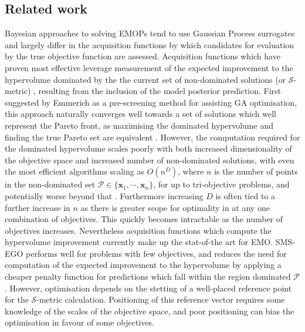 \documentclass[runningheads]{llncs}
\newcommand{\bx}{\mathbf{x}}
\begin{document}
\subsection{Related work}\label{section:related_work}
Bayesian approaches to solving EMOPs tend to use Gaussian Process surrogates and largely differ in the acquisition functions by which candidates for evaluation by the true objective function are assessed.  Acquisition functions which have proven most effective leverage measurement of the expected improvement to the hypervolume dominated by the the current set of non-dominated solutions (or $\mathcal{S}$-metric) \cite{emmerich2008computation}, resulting from the inclusion of the model posterior prediction. First suggested by Emmerich \cite{emmerich2006single} as a pre-screening method for assisting GA optimisation, this approach naturally converges well towards a set of solutions which well represent the Pareto front, as maximising the dominated hypervolume and finding the true Pareto set are equivalent \cite{fleischer2003measure}. However, the computation required for the dominated hypervolume scales poorly with both increased dimensionality of the objective space and increased number of non-dominated solutions, with even the most efficient algorithms scaling as $O(n^D)$, where $n$ is the number of points in the non-dominated set $\mathcal{P}\in\{\bx_1, \cdots, \bx_n\}$, for up to tri-objective problems, and potentially worse beyond that \cite{hupkens2014faster}. Furthermore increasing $D$ is often tied to a further increase in $n$ as there is greater scope for optimality in at any one combination of objectives. This quickly becomes intractable as the number of objectives increases. Nevertheless acquisition functions which compute the hypervolume improvement currently make up the stat-of-the art for EMO. SMS-EGO \cite{ponweiser2008multiobjective,wagner2010expected} performs well for problems with few objectives, and reduces the need for computation of the expected improvement to the hypervolume by applying a cheaper penalty function for predictions which fall within the region dominated $\mathcal{P}$. However, optimisation depends on the stetting of a well-placed reference point for the $\mathcal{S}$-metric calculation. Positioning of this reference vector requires some knowledge of the scales of the objective space, and poor positioning can bias the optimisation in favour of some objectives. 
\end{document}
